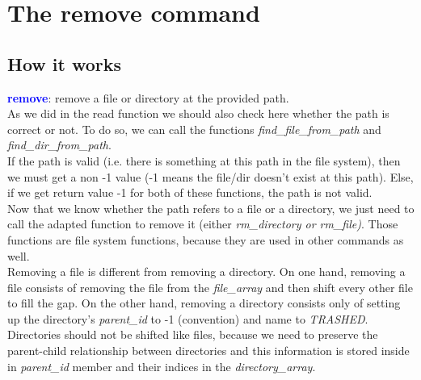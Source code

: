 \section{The remove command}

\subsection{How it works}
\textcolor{blue}{\textbf{remove}}: remove a file or directory at the provided path.\\

As we did in the read function we should also check here whether the path is correct or not. To do so, we can call the functions \textit{find\_file\_from\_path} and \textit{find\_dir\_from\_path}.\\

If the path is valid (i.e. there is something at this path in the file system), then we must get a non -1 value (-1 means the file/dir doesn't exist at this path). Else, if we get return value -1 for both of these functions, the path is not valid.\\

Now that we know whether the path refers to a file or a directory, we just need to call the adapted function to remove it (either \textit{rm\_directory or rm\_file)}. Those functions are file system functions, because they are used in other commands as well.\\

Removing a file is different from removing a directory.
On one hand, removing a file consists of removing the file from the \textit{file\_array} and then shift every other file to fill the gap.
On the other hand, removing a directory consists only of setting up the directory's \textit{parent\_id} to -1 (convention) and name to \textit{TRASHED}.\\

Directories should not be shifted like files, because we need to preserve the parent-child relationship between directories and this information is stored inside in \textit{parent\_id} member and their indices in the \textit{directory\_array}.\\

